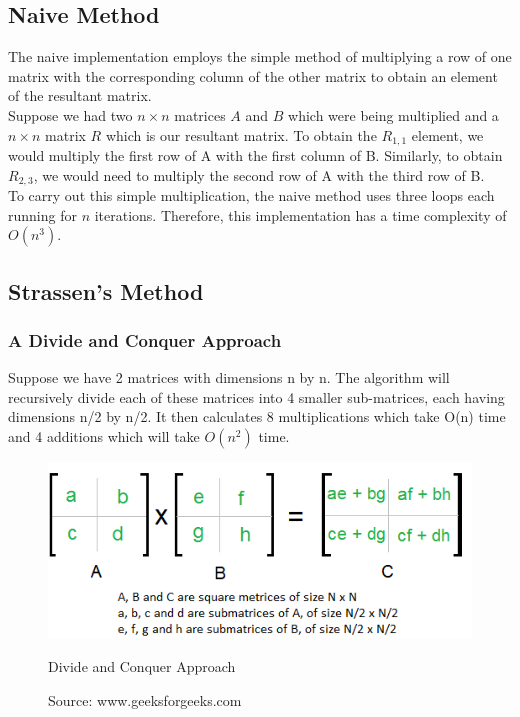 \documentclass{article}
\begin{document}
\subsection{Naive Method}
The naive implementation employs the simple method of multiplying a row of one matrix with the corresponding column of the other matrix to obtain an element of the resultant matrix.\\
Suppose we had two $n\times n$ matrices $A$ and $B$ which were being multiplied and a $n\times n$ matrix $R$ which is our resultant matrix. To obtain the $R_{1,1}$ element, we would multiply the first row of A with the first column of B. Similarly, to obtain $R_{2,3}$, we would need to multiply the second row of A with the third row of B.
\\
To carry out this simple multiplication, the naive method uses three loops each running for $n$ iterations. Therefore, this implementation has a time complexity of $O(n^3)$.


\subsection{Strassen's Method}

\subsubsection{A Divide and Conquer Approach}
Suppose we have 2 matrices with dimensions n by n. The algorithm will recursively divide each of these matrices into 4 smaller sub-matrices, each having dimensions n/2 by n/2. It then calculates 8 multiplications which take O(n) time and 4 additions which will take $O(n^2)$ time. 

\begin{figure}[h!]
    \centering
    \includegraphics[scale=0.8]{dnc.png}
    \caption{Divide and Conquer Approach}
    \caption*{Source: www.geeksforgeeks.com}
\end{figure}
\end{document}
